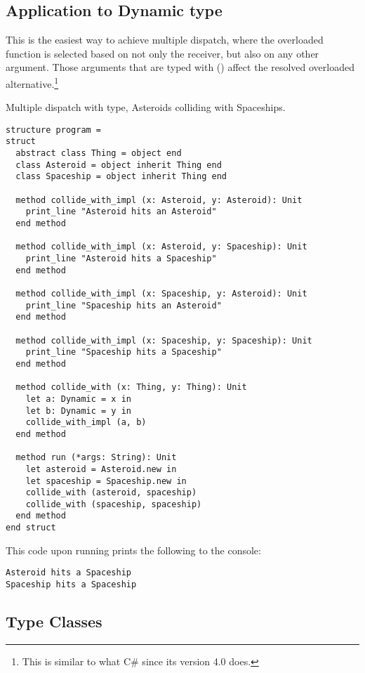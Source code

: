 \subsection{Application to Dynamic type}

This is the easiest way to achieve multiple dispatch, where the overloaded function is selected based on not only the receiver, but also on any other argument. Those arguments that are typed with  () affect the resolved overloaded alternative.\footnote{This is similar to what C\# since its version 4.0 does.}

\example Multiple dispatch with  type, Asteroids colliding with Spaceships.  
\begin{lstlisting}[morekeywords={Dynamic}]
structure program =
struct
  abstract class Thing = object end
  class Asteroid = object inherit Thing end
  class Spaceship = object inherit Thing end
  
  method collide_with_impl (x: Asteroid, y: Asteroid): Unit
    print_line "Asteroid hits an Asteroid"
  end method
  
  method collide_with_impl (x: Asteroid, y: Spaceship): Unit
    print_line "Asteroid hits a Spaceship"
  end method
  
  method collide_with_impl (x: Spaceship, y: Asteroid): Unit
    print_line "Spaceship hits an Asteroid"
  end method
  
  method collide_with_impl (x: Spaceship, y: Spaceship): Unit
    print_line "Spaceship hits a Spaceship"
  end method
  
  method collide_with (x: Thing, y: Thing): Unit
    let a: Dynamic = x in
    let b: Dynamic = y in
    collide_with_impl (a, b)
  end method
  
  method run (*args: String): Unit
    let asteroid = Asteroid.new in
    let spaceship = Spaceship.new in
    collide_with (asteroid, spaceship)
    collide_with (spaceship, spaceship)
  end method
end struct
\end{lstlisting}
This code upon running  prints the following to the console:
\begin{lstlisting}
Asteroid hits a Spaceship
Spaceship hits a Spaceship
\end{lstlisting}





\subsection{Type Classes}

